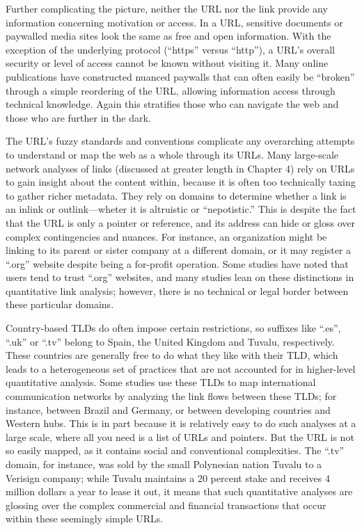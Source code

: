 Further complicating the picture, neither the URL nor the link provide any information concerning motivation or access. In a URL, sensitive documents or paywalled media sites look the same as free and open information. With the exception of the underlying protocol (``https'' versus ``http''), a URL's overall security or level of access cannot be known without visiting it. Many online publications have constructed nuanced paywalls that can often easily be ``broken'' through a simple reordering of the URL, allowing information access through technical knowledge. Again this stratifies those who can navigate the web and those who are further in the dark.

The URL's fuzzy standards and conventions complicate any overarching attempts to understand or map the web as a whole through its URLs. Many large-scale network analyses of links (discussed at greater length in Chapter 4) rely on URLs to gain insight about the content within, because it is often too technically taxing to gather richer metadata. They rely on domains to determine whether a link is an inlink or outlink---wheter it is altruistic or ``nepotistic.''\autocite{chakrabarti} This is despite the fact that the URL is only a pointer or reference, and its address can hide or gloss over complex contingencies and nuances. For instance, an organization might be linking to its parent or sister company at a different domain, or it may register a ``.org'' website despite being a for-profit operation. Some studies have noted that users tend to trust ``.org'' websites, and many studies lean on these distinctions in quantitative link analysis; however, there is no technical or legal border between these particular domains.\autocite{err find all this wherever I read it}

Country-based TLDs do often impose certain restrictions, so suffixes like ``.es'', ``.uk'' or ``.tv'' belong to Spain, the United Kingdom and Tuvalu, respectively. These countries are generally free to do what they like with their TLD, which leads to a heterogeneous set of practices that are not accounted for in higher-level quantitative analysis. Some studies use these TLDs to map international communication networks by analyzing the link flows between these TLDs; for instance, between Brazil and Germany, or between developing countries and Western hubs.\autocite{park, others} This is in part because it is relatively easy to do such analyses at a large scale, where all you need is a list of URLs and pointers. But the URL is not so easily mapped, as it contains social and conventional complexities. The ``.tv'' domain, for instance, was sold by the small Polynesian nation Tuvalu to a Verisign company; while Tuvalu maintains a 20 percent stake and receives 4 million dollars a year to lease it out, it means that such quantitative analyses are glossing over the complex commercial and financial transactions that occur within these seemingly simple URLs.\autocite{find cite for .tv sale}

